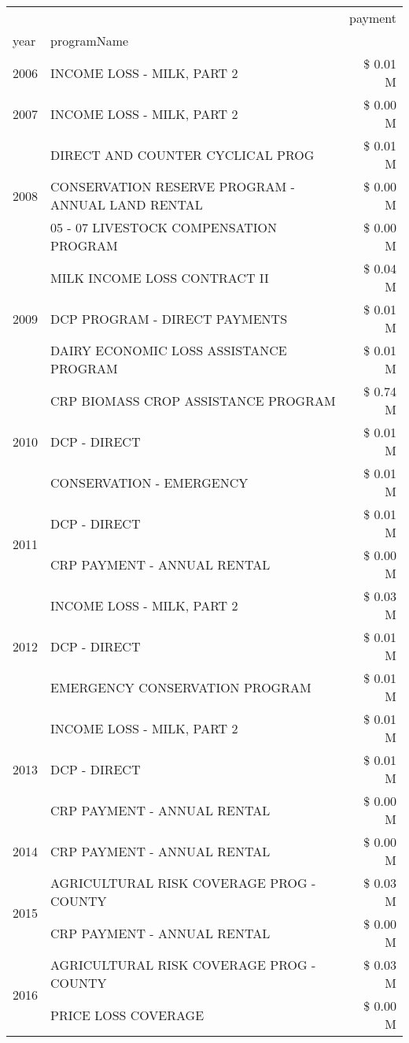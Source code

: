 \begin{tabular}{llr}
\toprule
 &  & payment \\
year & programName &  \\
\midrule
2006 & INCOME LOSS - MILK, PART 2 & \$ 0.01 M \\
\cline{1-3}
2007 & INCOME LOSS - MILK, PART 2 & \$ 0.00 M \\
\cline{1-3}
\multirow[t]{3}{*}{2008} & DIRECT AND COUNTER CYCLICAL PROG & \$ 0.01 M \\
 & CONSERVATION RESERVE PROGRAM - ANNUAL LAND RENTAL & \$ 0.00 M \\
 & 05 - 07 LIVESTOCK COMPENSATION PROGRAM & \$ 0.00 M \\
\cline{1-3}
\multirow[t]{3}{*}{2009} & MILK INCOME LOSS CONTRACT II & \$ 0.04 M \\
 & DCP PROGRAM - DIRECT PAYMENTS & \$ 0.01 M \\
 & DAIRY ECONOMIC LOSS ASSISTANCE PROGRAM & \$ 0.01 M \\
\cline{1-3}
\multirow[t]{3}{*}{2010} & CRP BIOMASS CROP ASSISTANCE PROGRAM & \$ 0.74 M \\
 & DCP - DIRECT & \$ 0.01 M \\
 & CONSERVATION - EMERGENCY & \$ 0.01 M \\
\cline{1-3}
\multirow[t]{2}{*}{2011} & DCP - DIRECT & \$ 0.01 M \\
 & CRP PAYMENT - ANNUAL RENTAL & \$ 0.00 M \\
\cline{1-3}
\multirow[t]{3}{*}{2012} & INCOME LOSS - MILK, PART 2 & \$ 0.03 M \\
 & DCP - DIRECT & \$ 0.01 M \\
 & EMERGENCY CONSERVATION PROGRAM & \$ 0.01 M \\
\cline{1-3}
\multirow[t]{3}{*}{2013} & INCOME LOSS - MILK, PART 2 & \$ 0.01 M \\
 & DCP - DIRECT & \$ 0.01 M \\
 & CRP PAYMENT - ANNUAL RENTAL & \$ 0.00 M \\
\cline{1-3}
2014 & CRP PAYMENT - ANNUAL RENTAL & \$ 0.00 M \\
\cline{1-3}
\multirow[t]{2}{*}{2015} & AGRICULTURAL RISK COVERAGE PROG - COUNTY & \$ 0.03 M \\
 & CRP PAYMENT - ANNUAL RENTAL & \$ 0.00 M \\
\cline{1-3}
\multirow[t]{3}{*}{2016} & AGRICULTURAL RISK COVERAGE PROG - COUNTY & \$ 0.03 M \\
 & PRICE LOSS COVERAGE & \$ 0.00 M \\

\end{tabular}

